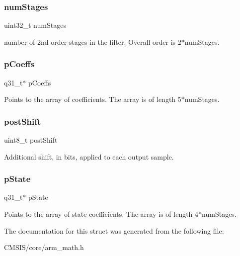 \subsubsection{\texorpdfstring{num\+Stages}{numStages}}
{\footnotesize\ttfamily uint32\+\_\+t num\+Stages}

number of 2nd order stages in the filter. Overall order is 2$\ast$num\+Stages. \mbox{\label{structarm__biquad__casd__df1__inst__q31_a68888e36167d81cb7836db10367a1682}} 
\subsubsection{\texorpdfstring{p\+Coeffs}{pCoeffs}}
{\footnotesize\ttfamily q31\+\_\+t$\ast$ p\+Coeffs}

Points to the array of coefficients. The array is of length 5$\ast$num\+Stages. \mbox{\label{structarm__biquad__casd__df1__inst__q31_a74050e9f36542bd56f4052381a82ae8f}} 
\subsubsection{\texorpdfstring{post\+Shift}{postShift}}
{\footnotesize\ttfamily uint8\+\_\+t post\+Shift}

Additional shift, in bits, applied to each output sample. \mbox{\label{structarm__biquad__casd__df1__inst__q31_adee4ba3ee8869865af7d8fa08ca913d6}} 
\subsubsection{\texorpdfstring{p\+State}{pState}}
{\footnotesize\ttfamily q31\+\_\+t$\ast$ p\+State}

Points to the array of state coefficients. The array is of length 4$\ast$num\+Stages. 

The documentation for this struct was generated from the following file\+:\begin{DoxyCompactItemize}
\item 
C\+M\+S\+I\+S/core/arm\+\_\+math.\+h\end{DoxyCompactItemize}
